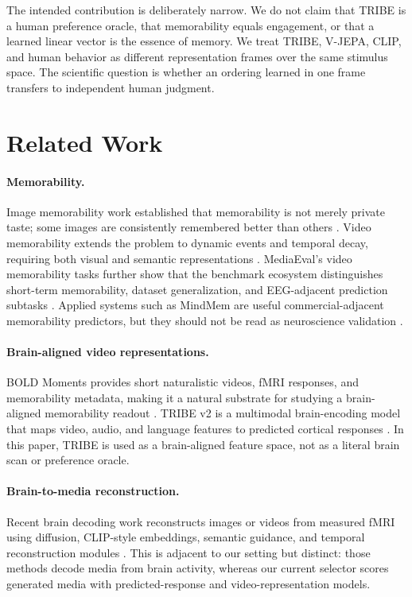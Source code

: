 \documentclass[11pt]{article}
\begin{document}
The intended contribution is deliberately narrow. We do not claim that TRIBE is
a human preference oracle, that memorability equals engagement, or that a learned
linear vector is the essence of memory. We treat TRIBE, V-JEPA, CLIP, and human
behavior as different representation frames over the same stimulus space. The
scientific question is whether an ordering learned in one frame transfers to
independent human judgment.

\section{Related Work}

\paragraph{Memorability.}
Image memorability work established that memorability is not merely private
taste; some images are consistently remembered better than others
\citep{isola2011memorability}. Video memorability extends the problem to dynamic
events and temporal decay, requiring both visual and semantic representations
\citep{newman2020memento,cohendet2019videomem}. MediaEval's video
memorability tasks further show that the benchmark ecosystem distinguishes
short-term memorability, dataset generalization, and EEG-adjacent prediction
subtasks \citep{sweeney2022mediaeval}. Applied systems such as MindMem are
useful commercial-adjacent memorability predictors, but they should not be read
as neuroscience validation \citep{asgarian2025mindmem}.

\paragraph{Brain-aligned video representations.}
BOLD Moments provides short naturalistic videos, fMRI responses, and
memorability metadata, making it a natural substrate for studying a
brain-aligned memorability readout \citep{lahner2024boldmoments}. TRIBE v2 is a
multimodal brain-encoding model that maps video, audio, and language features to
predicted cortical responses \citep{tribev2}. In this paper, TRIBE is used as a
brain-aligned feature space, not as a literal brain scan or preference oracle.

\paragraph{Brain-to-media reconstruction.}
Recent brain decoding work reconstructs images or videos from measured fMRI
using diffusion, CLIP-style embeddings, semantic guidance, and temporal
reconstruction modules
\citep{lu2023minddiffuser,chen2023mindvideo,gong2024neuroclips,sun2024neurocine,yang2026semvideo}.
This is adjacent to our setting but distinct: those methods decode media from
brain activity, whereas our current selector scores generated media with
predicted-response and video-representation models.
\end{document}
